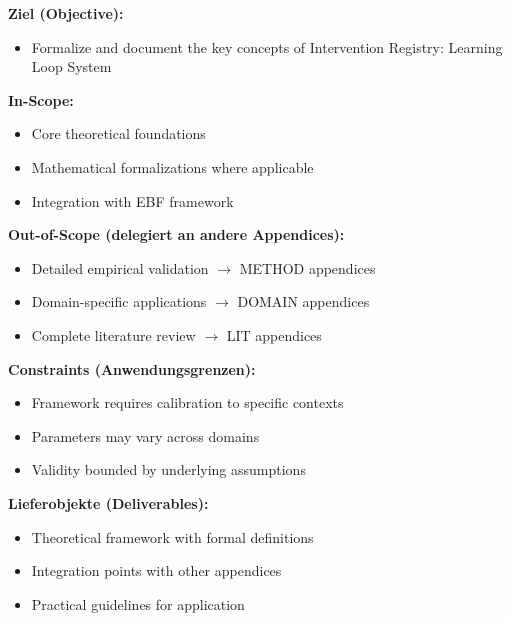 \begin{tcolorbox}[
    colback=orange!5!white,
    colframe=orange!75!black,
    title={\textbf{Appendix Scope: Ziel / In-Scope / Out-of-Scope / Constraints}},
    fonttitle=\bfseries
]

\textbf{Ziel (Objective):}
\begin{itemize}[nosep]
    \item Formalize and document the key concepts of Intervention Registry: Learning Loop System
\end{itemize}

\textbf{In-Scope:}
\begin{itemize}[nosep]
    \item Core theoretical foundations
    \item Mathematical formalizations where applicable
    \item Integration with EBF framework
\end{itemize}

\textbf{Out-of-Scope (delegiert an andere Appendices):}
\begin{itemize}[nosep]
    \item Detailed empirical validation $\rightarrow$ METHOD appendices
    \item Domain-specific applications $\rightarrow$ DOMAIN appendices
    \item Complete literature review $\rightarrow$ LIT appendices
\end{itemize}

\textbf{Constraints (Anwendungsgrenzen):}
\begin{itemize}[nosep]
    \item Framework requires calibration to specific contexts
    \item Parameters may vary across domains
    \item Validity bounded by underlying assumptions
\end{itemize}

\textbf{Lieferobjekte (Deliverables):}
\begin{itemize}[nosep]
    \item Theoretical framework with formal definitions
    \item Integration points with other appendices
    \item Practical guidelines for application
\end{itemize}

\end{tcolorbox}



